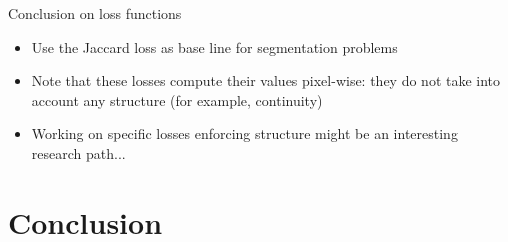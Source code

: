 \documentclass[xcolor=pdftex,dvipsnames,table,mathserif]{beamer}
\newcommand{\source}[1]{\begin{textblock*}{4cm}(8.7cm,8.6cm)
    \begin{beamercolorbox}[ht=0.5cm,right]{framesource}
      \usebeamerfont{framesource}\usebeamercolor[fg]{framesource} Credits: {#1}
    \end{beamercolorbox}
\end{textblock*}}
\begin{document}
\begin{frame}{Conclusion on loss functions}

  \begin{itemize}
  \item Use the Jaccard loss as base line for segmentation problems
  \item Note that these losses compute their values pixel-wise: they do not take into account any structure (for example, continuity)
  \item Working on specific losses enforcing structure might be an interesting research path...
  \end{itemize}
\end{frame}





\section{Conclusion}


\end{document}
